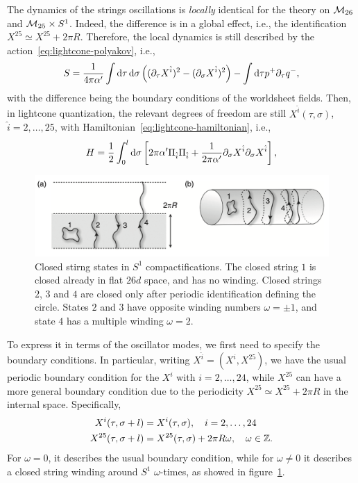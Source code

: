 The dynamics of the strings oscillations is \emph{locally} identical for the theory on $\mathcal{M}_{26}$ and $\mathcal{M}_{25} \times S^1$. Indeed, the difference is in a global effect, i.e., the identification $X^{25} \simeq X^{25} + 2\pi R$. Therefore, the local dynamics is still described by the action~\eqref{eq:lightcone-polyakov}, i.e.,
\begin{equation}
    S = \frac{1}{4\pi\alpha'} \int \mathop{}\!\mathrm{d} \tau \mathop{}\!\mathrm{d} \sigma \left( (\partial_\tau X^{\hat{i}})^2 - (\partial_\sigma X^{\hat{i}})^2 \right) - \int \mathop{}\!\mathrm{d} \tau p^+ \partial_\tau q^-,
\end{equation}
with the difference being the boundary conditions of the worldsheet fields. Then, in lightcone quantization, the relevant degrees of freedom are still $X^{\hat{i}}(\tau,\sigma)$, $\hat{i} = 2, \dots, 25$, with Hamiltonian~\eqref{eq:lightcone-hamiltonian}, i.e.,
\begin{equation}
    H = \frac{1}{2} \int_0^l \mathop{}\!\mathrm{d} \sigma \left[ 2\pi\alpha' \Pi_{\hat{i}} \Pi_{\hat{i}} + \frac{1}{2\pi\alpha'} \partial_\sigma X^{\hat{i}} \partial_\sigma X^{\hat{i}} \right],
\end{equation}

\begin{figure}
    \centering
    \includegraphics[width=\textwidth]{figures/winding.png}
    \caption{Closed stirng states in $S^1$ compactifications. The closed string $1$ is closed already in flat $26d$ space, and has no winding. Closed strings $2$, $3$ and $4$ are closed only after periodic identification defining the circle. States $2$ and $3$ have opposite winding numbers $\omega = \pm 1$, and state $4$ has a multiple winding $\omega = 2$.}
    \label{fig:winding}
\end{figure}

To express it in terms of the oscillator modes, we first need to specify the boundary conditions. In particular, writing $X^{\hat{i}} = (X^i, X^{25})$, we have the usual periodic boundary condition for the $X^i$ with $i = 2, \dots, 24$, while $X^{25}$ can have a more general boundary condition due to the periodicity $X^{25}\simeq X^{25} + 2\pi R$ in the internal space. Specifically,
\begin{subequations}
\begin{align}
    X^i(\tau,\sigma + l) &= X^i(\tau,\sigma), \quad i = 2, \dots, 24\\
    X^{25}(\tau,\sigma + l) &= X^{25}(\tau,\sigma) + 2\pi R \omega, \quad \omega \in \mathbb{Z}.
\end{align}
\end{subequations}
For $\omega = 0$, it describes the usual boundary condition, while for $\omega \neq 0$ it describes a closed string winding around $S^1$ $\omega$-times, as showed in figure~\ref{fig:winding}.

